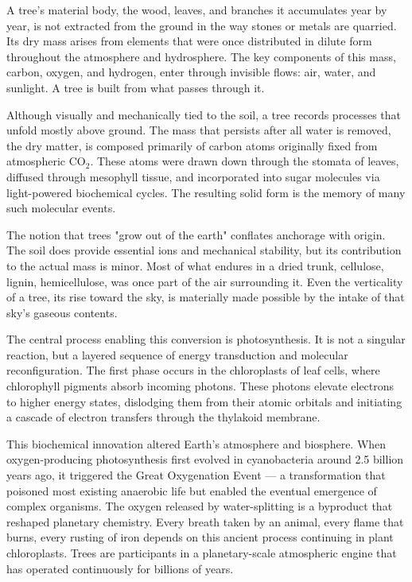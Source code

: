 A tree's material body, the wood, leaves, and branches it accumulates year by year, is not extracted from the ground in the way stones or metals are quarried. Its dry mass arises from elements that were once distributed in dilute form throughout the atmosphere and hydrosphere. The key components of this mass, carbon, oxygen, and hydrogen, enter through invisible flows: air, water, and sunlight. A tree is built from what passes through it.

Although visually and mechanically tied to the soil, a tree records processes that unfold mostly above ground. The mass that persists after all water is removed, the dry matter, is composed primarily of carbon atoms originally fixed from atmospheric \(\mathrm{CO}_2\). These atoms were drawn down through the stomata of leaves, diffused through mesophyll tissue, and incorporated into sugar molecules via light-powered biochemical cycles. The resulting solid form is the memory of many such molecular events.

The notion that trees "grow out of the earth" conflates anchorage with origin. The soil does provide essential ions and mechanical stability, but its contribution to the actual mass is minor. Most of what endures in a dried trunk, cellulose, lignin, hemicellulose, was once part of the air surrounding it. Even the verticality of a tree, its rise toward the sky, is materially made possible by the intake of that sky's gaseous contents.

The central process enabling this conversion is photosynthesis. It is not a singular reaction, but a layered sequence of energy transduction and molecular reconfiguration. The first phase occurs in the chloroplasts of leaf cells, where chlorophyll pigments absorb incoming photons. These photons elevate electrons to higher energy states, dislodging them from their atomic orbitals and initiating a cascade of electron transfers through the thylakoid membrane.

This biochemical innovation altered Earth's atmosphere and biosphere. When oxygen-producing photosynthesis first evolved in cyanobacteria around 2.5 billion years ago, it triggered the Great Oxygenation Event — a transformation that poisoned most existing anaerobic life but enabled the eventual emergence of complex organisms. The oxygen released by water-splitting is a byproduct that reshaped planetary chemistry. Every breath taken by an animal, every flame that burns, every rusting of iron depends on this ancient process continuing in plant chloroplasts. Trees are participants in a planetary-scale atmospheric engine that has operated continuously for billions of years.

